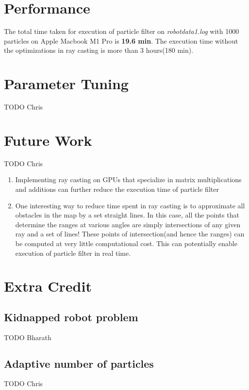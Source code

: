 \documentclass[12pt, a4paper]{article}
\begin{document}
\section{Performance}
The total time taken for execution of particle filter on \textit{robotdata1.log} with 1000 particles on Apple Macbook M1 Pro is \textbf{19.6 min}. The execution time without the optimizations in ray casting is more than 3 hours(180 min).
\section{Parameter Tuning}
TODO Chris
\section{Future Work}
TODO Chris
\begin{enumerate}
  \item Implementing ray casting on GPUs that specialize in matrix multiplications and additions can further reduce the execution time of particle filter
  \item One interesting way to reduce time spent in ray casting is to approximate all obstacles in the map by a set straight lines. In this case, all the points that determine the ranges at various angles are simply intersections of any given ray and a set of lines! These points of intersection(and hence the ranges) can be computed at very little computational cost. This can potentially enable execution of particle filter in real time.
\end{enumerate}
\section{Extra Credit}
\subsection{Kidnapped robot problem}
TODO Bharath
\subsection{Adaptive number of particles}
TODO Chris
\end{document}
